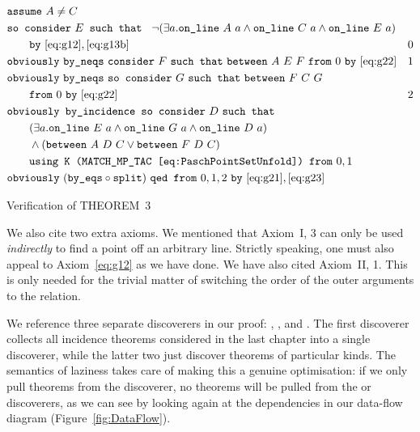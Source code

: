 \begin{boxedfigure}
  \begin{align*}
    &\code{assume}\ A\neq C\\
    &\code{so consider}\ E \code{ such that }\ \Triangle{a}{A}{C}{E}\\
    &\qquad\code{by}\ \eqref{eq:g12},\eqref{eq:g13b}& 0\\
    &\code{obviously}\ \code{by\_neqs}\ \code{consider}\ F\ \code{such that}\ \between{A}{E}{F}\ \code{from}\ 0\ \code{by}\ \eqref{eq:g22} & 1\\
    &\code{obviously}\ \code{by\_neqs}\ \code{so consider}\ G\ \code{such that}\ \between{F}{C}{G}\\&\qquad \code{from}\ 0\ \code{by}\ \eqref{eq:g22} & 2\\
    &\code{obviously by\_incidence so consider}\ D\ \code{such that}\\
    &\qquad(\exists a. \code{on\_line}\ E\ a \wedge \code{on\_line}\ G\ a \wedge \code{on\_line}\ D\ a)\\
    &\qquad \wedge (\between{A}{D}{C}\vee\between{F}{D}{C})\\
    &\qquad \code{using K (MATCH\_MP\_TAC \eqref{eq:PaschPointSetUnfold}) from}\ 0,1\\
    &\code{obviously}\ (\code{by\_eqs}\circ\code{split})\ \code{qed from}\ 0,1,2\ \code{by}\ \eqref{eq:g21},\eqref{eq:g23}
  \end{align*}
\caption{Verification of THEOREM~3}
\label{fig:ThreeVerification}
\end{boxedfigure}

We also cite two extra axioms. We mentioned that Axiom~I, 3 can only be used \emph{indirectly} to find a point off an arbitrary line. Strictly speaking, one must also appeal to Axiom~\ref{eq:g12} as we have done. We have also cited Axiom~II, 1. This is only needed for the trivial matter of switching the order of the outer arguments to the  relation. 

We reference three separate discoverers in our proof: , , and . The first discoverer collects all incidence theorems considered in the last chapter into a single discoverer, while the latter two just discover theorems of particular kinds. The semantics of laziness takes care of making this a genuine optimisation: if we only pull theorems from the  discoverer, no theorems will be pulled from the  or  discoverers, as we can see by looking again at the dependencies in our data-flow diagram (Figure~\ref{fig:DataFlow}).

